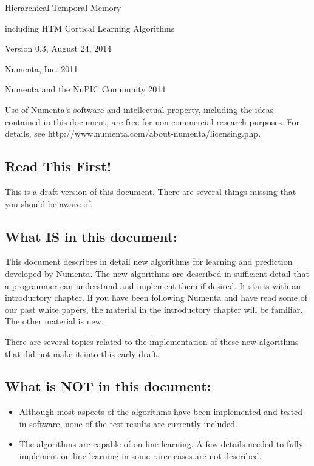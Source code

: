 \documentclass{report}
\newlength{\drop}
\newcommand*{\titleHTMCLA}{\begingroup%
\drop=0.08\textheight
\vspace*{\drop}
\begin{center}
{\Huge Hierarchical Temporal Memory\par}
{\Large including HTM Cortical Learning Algorithms\par}
\vfill
{\Large Version 0.3, August 24, 2014\par}
{\Large \textcopyright{} Numenta, Inc. 2011\par}
{\Large \textcopyright{} Numenta and the NuPIC Community 2014\par}
\end{center}
\vfill
\endgroup}
\begin{document}
\lstset{language=Python}        %



\pagestyle{empty}
\titleHTMCLA

Use of Numenta's software and intellectual property, including the
ideas contained in this document, are free for non-commercial research
purposes. For details, see
http://www.numenta.com/about-numenta/licensing.php.

\clearpage

\subsection*{Read This First!}

This is a draft version of this document. There are several things
missing that you should be aware of.

\subsection*{What IS in this document:}
This document describes in detail new algorithms for learning and
prediction developed by Numenta. The new algorithms are described in
sufficient detail that a programmer can understand and implement them
if desired. It starts with an introductory chapter. If you have been
following Numenta and have read some of our past white papers, the
material in the introductory chapter will be familiar. The other
material is new.

There are several topics related to the implementation of these new
algorithms that did not make it into this early draft.

\subsection*{What is NOT in this document:}

\begin{itemize}

\item Although most aspects of the algorithms have been implemented
and tested in software, none of the test results are currently
included.

\item The algorithms are capable of on-line learning. A few details
needed to fully implement on-line learning in some rarer cases are not
described.

\end{itemize}
\end{document}
